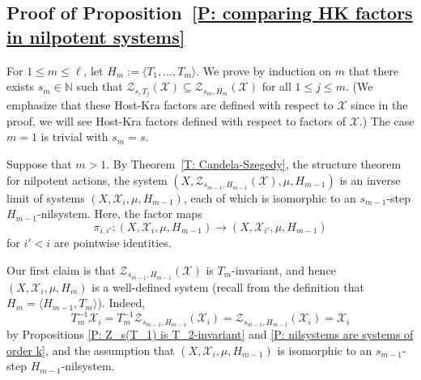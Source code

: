 \documentclass[11pt]{amsart}
\theoremstyle{definition}
\newcommand{\N}{{\mathbb N}}
\newcommand{\CX}{{\mathcal X}}
\newcommand{\CZ}{{\mathcal Z}}
\newcommand{\1}{{\mathbf{1}}}
\begin{document}
\subsection{Proof of Proposition~\ref{P: comparing HK factors in nilpotent systems}}
For $1\leq m\leq \ell$, let $H_m := \langle T_1, \ldots, T_m\rangle$. We prove by induction on $m$ that there exists $s_m\in\N$ such that $\CZ_{s,T_j}(\CX)\subseteq \CZ_{s_m, H_m}(\CX)$ for all $1\leq j\leq m$. (We emphasize that these Host-Kra factors are defined with respect to $\CX$ since in the proof, we will see Host-Kra factors defined with respect to factors of $\CX$.) The case $m=1$ is trivial with $s_m = s$. 

Suppose that $m>1$. By Theorem~\ref{T: Candela-Szegedy}, the structure theorem for nilpotent actions, the system
$(X,\CZ_{s_{m-1},H_{m-1}}(\CX),\mu,H_{m-1})$ is an inverse limit of systems $(X,\mathcal{X}_{i},\mu,H_{m-1})$, each of which is isomorphic to an $s_{m-1}$-step $H_{m-1}$-nilsystem. Here, the factor maps $$\pi_{ i,i'}\colon (X,\mathcal{X}_{i},\mu,H_{m-1})\to (X,\mathcal{X}_{i'},\mu,H_{m-1})$$ for $i'<i$ are pointwise identities. 

Our first claim is that  $\CZ_{s_{m-1},H_{m-1}}(\CX)$ is $T_m$-invariant, and hence $(X,\mathcal{X}_{i},\mu,H_m)$ is a well-defined system (recall from the definition that $H_m = \langle H_{m-1},T_m\rangle$). Indeed, $$T_{m}^{-1}\mathcal{X}_{i}=T_{m}^{-1}\CZ_{s_{m-1}, H_{m-1}}(\mathcal{X}_{i})=\CZ_{s_{m-1}, H_{m-1}}(\CX_i)=\mathcal{X}_{i}$$
by Propositions \ref{P: Z_s(T_1) is T_2-invariant} and \ref{P: nilsystems are systems of order k}, and the assumption that $(X,\mathcal{X}_{i},\mu,H_{m-1})$ is isomorphic to an $s_{m-1}$-step $H_{m-1}$-nilsystem.
\end{document}

